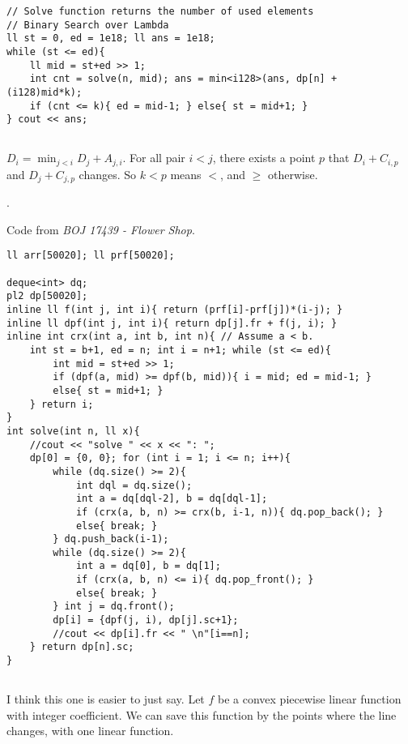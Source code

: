 \documentclass[landscape, 8pt, a4paper, oneside, twocolumn]{extarticle}
\begin{document}
\begin{verbatim}
// Solve function returns the number of used elements
// Binary Search over Lambda
ll st = 0, ed = 1e18; ll ans = 1e18;
while (st <= ed){
    ll mid = st+ed >> 1;
    int cnt = solve(n, mid); ans = min<i128>(ans, dp[n] + (i128)mid*k);
    if (cnt <= k){ ed = mid-1; } else{ st = mid+1; }
} cout << ans;
\end{verbatim}
\subsection{}
$D_i = \min_{j<i} D_j + A_{j,i}$. For all pair $i < j$, there exists a point $p$ that $D_i + C_{i,p}$ and $D_j + C_{j,p}$ changes. So $k < p$ means $<$, and $\ge$ otherwise.

.

Code from \textit{BOJ 17439 - Flower Shop}.
\begin{verbatim}
ll arr[50020]; ll prf[50020];

deque<int> dq;
pl2 dp[50020];
inline ll f(int j, int i){ return (prf[i]-prf[j])*(i-j); }
inline ll dpf(int j, int i){ return dp[j].fr + f(j, i); }
inline int crx(int a, int b, int n){ // Assume a < b.
    int st = b+1, ed = n; int i = n+1; while (st <= ed){
        int mid = st+ed >> 1;
        if (dpf(a, mid) >= dpf(b, mid)){ i = mid; ed = mid-1; }
        else{ st = mid+1; }
    } return i;
}
int solve(int n, ll x){
    //cout << "solve " << x << ": ";
    dp[0] = {0, 0}; for (int i = 1; i <= n; i++){
        while (dq.size() >= 2){
            int dql = dq.size();
            int a = dq[dql-2], b = dq[dql-1];
            if (crx(a, b, n) >= crx(b, i-1, n)){ dq.pop_back(); }
            else{ break; }
        } dq.push_back(i-1);
        while (dq.size() >= 2){
            int a = dq[0], b = dq[1];
            if (crx(a, b, n) <= i){ dq.pop_front(); }
            else{ break; }
        } int j = dq.front();
        dp[i] = {dpf(j, i), dp[j].sc+1};
        //cout << dp[i].fr << " \n"[i==n];
    } return dp[n].sc;
}
\end{verbatim}
\subsection{}
I think this one is easier to just say. Let $f$ be a convex piecewise linear function with integer coefficient.
We can save this function by the points where the line changes, with one linear function.
\end{document}
